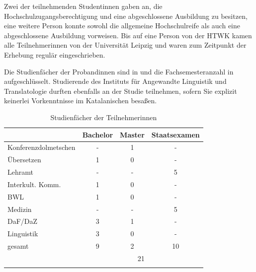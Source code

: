 Zwei der teilnehmenden Student{\textperiodcentered}innen gaben an, die Hochschulzugangsberechtigung und eine abgeschlossene Ausbildung zu besitzen, eine weitere Person konnte sowohl die allgemeine Hochschulreife als auch eine abgeschlossene Ausbildung vorweisen. Bis auf eine Person von der HTWK kamen alle Teilnehmer{\textperiodcentered}innen von der Universität Leipzig und waren zum Zeitpunkt der Erhebung regulär eingeschrieben. 

Die Studienfächer der Proband{\textperiodcentered}innen sind in  und die Fachsemesteranzahl in  aufgeschlüsselt. Studierende des Instituts für Angewandte Linguistik und Translatologie durften ebenfalls an der Studie teilnehmen, sofern Sie explizit keinerlei Vorkenntnisse im Katalanischen besaßen.



\begin{table}
	\begin{tabular}{lccc}
	\lsptoprule
		& {Bachelor} & {Master} & {Staatsexamen}\\ 
	\midrule
		Konferenzdolmetschen & - & 1 & - \\ 
		Übersetzen & 1 & 0 & -\\ 
		Lehramt & - & - & 5 \\ 
		Interkult. Komm. & 1 & 0 & - \\ 
		BWL & 1 & 0 & - \\ 
		Medizin & - & - & 5 \\ 
		DaF/DaZ & 3 & 1 & - \\ 
		Linguistik & 3 & 0 & -\\\midrule
		{gesamt} & 9 & 2 & 10\\\cmidrule(lr){2-4}
		& \multicolumn{3}{c}{21} \\ 
	\lspbottomrule
	\end{tabular}
	\caption{Studienfächer der Teilnehmer{\textperiodcentered}innen\label{K6:tab:Fach_TN-Feldstudie-CatDe}}
\end{table}

